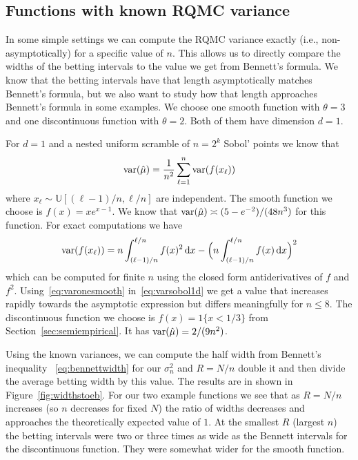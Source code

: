 \documentclass{article}
\renewcommand{\le}{\leqslant}
\newcommand{\dunif}{\mathbb{U}}
\newcommand{\rd}{\,\mathrm{d}}
\begin{document}
\subsection{Functions with known RQMC variance}

In some simple settings we can compute the
RQMC variance exactly (i.e., non-asymptotically)
for a specific value of $n$.
This allows us to directly
compare the widths of the betting intervals to
the value we get from Bennett's formula. We know
that the betting intervals have that length
asymptotically matches Bennett's formula, but
we also want to study how that length
approaches Bennett's formula in some examples.
We choose one smooth function with $\theta=3$
and one discontinuous function with $\theta=2$.
Both of them have dimension $d=1$.

For $d=1$ and a nested uniform scramble of $n=2^k$ Sobol'
points we know that 
\begin{align}\label{eq:varsobol1d}
\operatorname{var}(\hat\mu) =\frac1{n^2}\sum_{\ell=1}^n\operatorname{var}( f(x_\ell))
\end{align}
where $x_\ell\sim\dunif[(\ell-1)/n,\ell/n]$ are independent.
The smooth function we choose is $f(x)=xe^{x-1}$.
We know that $\operatorname{var}(\hat\mu)\asymp (5-e^{-2})/(48n^3)$
for this function.
For exact computations we have
\begin{align}\label{eq:varonesmooth}
\var(f(x_\ell))=n\int_{(\ell-1)/n}^{\ell/n}f(x)^2\rd x
-\Bigl(n\int_{(\ell-1)/n}^{\ell/n}f(x)\rd x\Bigr)^2
\end{align}
which can be computed for finite $n$ using the closed form antiderivatives of $f$ and $f^2$.  Using~\eqref{eq:varonesmooth}
in~\eqref{eq:varsobol1d} we get a value that increases
rapidly towards the asymptotic expression but differs
meaningfully for $n\le 8$.
The discontinuous function we choose is $f(x)=1\{x<1/3\}$
from Section~\ref{sec:semiempirical}.
It has $\operatorname{var}(\hat\mu)=2/(9n^2)$.

Using the known variances, we can compute the
half width from Bennett's inequality ~\eqref{eq:bennettwidth}
for our $\sigma^2_n$ and $R=N/n$ double it
and then divide the average betting width
by this value. The results are in shown  in Figure~\ref{fig:widthstoeb}. For our two example
functions we see that as $R=N/n$ increases (so $n$ decreases
for fixed $N$)
the ratio of widths decreases and approaches the
theoretically expected value of $1$.
At the smallest $R$ (largest $n$) the betting
intervals were two or three times as wide as the
Bennett intervals for the discontinuous function.
They were somewhat wider for the smooth function.
\end{document}
